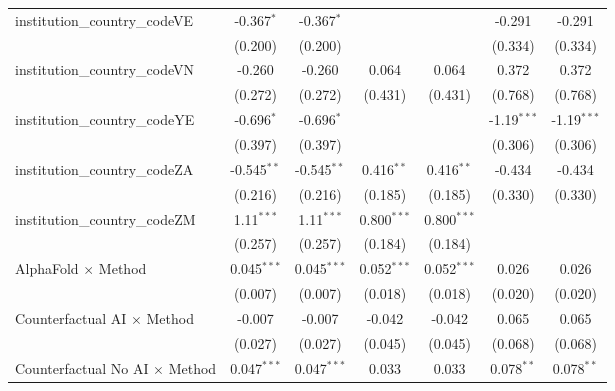\begin{tabular}{lcccccc}
   institution\_country\_codeVE          & -0.367$^{*}$   & -0.367$^{*}$   &                &                & -0.291         & -0.291\\   
                                         & (0.200)        & (0.200)        &                &                & (0.334)        & (0.334)\\   
   institution\_country\_codeVN          & -0.260         & -0.260         & 0.064          & 0.064          & 0.372          & 0.372\\   
                                         & (0.272)        & (0.272)        & (0.431)        & (0.431)        & (0.768)        & (0.768)\\   
   institution\_country\_codeYE          & -0.696$^{*}$   & -0.696$^{*}$   &                &                & -1.19$^{***}$  & -1.19$^{***}$\\   
                                         & (0.397)        & (0.397)        &                &                & (0.306)        & (0.306)\\   
   institution\_country\_codeZA          & -0.545$^{**}$  & -0.545$^{**}$  & 0.416$^{**}$   & 0.416$^{**}$   & -0.434         & -0.434\\   
                                         & (0.216)        & (0.216)        & (0.185)        & (0.185)        & (0.330)        & (0.330)\\   
   institution\_country\_codeZM          & 1.11$^{***}$   & 1.11$^{***}$   & 0.800$^{***}$  & 0.800$^{***}$  &                &   \\   
                                         & (0.257)        & (0.257)        & (0.184)        & (0.184)        &                &   \\   
   AlphaFold $\times$ Method             & 0.045$^{***}$  & 0.045$^{***}$  & 0.052$^{***}$  & 0.052$^{***}$  & 0.026          & 0.026\\   
                                         & (0.007)        & (0.007)        & (0.018)        & (0.018)        & (0.020)        & (0.020)\\   
   Counterfactual AI $\times$ Method     & -0.007         & -0.007         & -0.042         & -0.042         & 0.065          & 0.065\\   
                                         & (0.027)        & (0.027)        & (0.045)        & (0.045)        & (0.068)        & (0.068)\\   
   Counterfactual No AI $\times$ Method  & 0.047$^{***}$  & 0.047$^{***}$  & 0.033          & 0.033          & 0.078$^{**}$   & 0.078$^{**}$\\   

\end{tabular}
